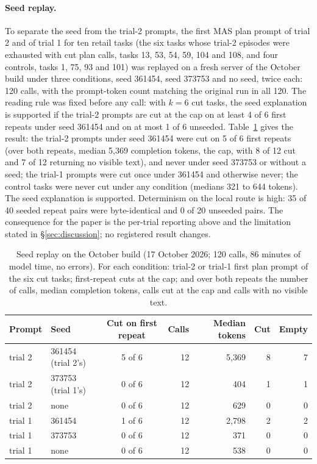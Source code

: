 \paragraph{Seed replay.} To separate the seed from the trial-2 prompts, the first MAS plan prompt of trial 2 and of trial 1 for ten retail tasks (the six tasks whose trial-2 episodes were exhausted with cut plan calls, tasks 13, 53, 54, 59, 104 and 108, and four controls, tasks 1, 75, 93 and 101) was replayed on a fresh server of the October build under three conditions, seed 361454, seed 373753 and no seed, twice each: 120 calls, with the prompt-token count matching the original run in all 120. The reading rule was fixed before any call: with $k = 6$ cut tasks, the seed explanation is supported if the trial-2 prompts are cut at the cap on at least 4 of 6 first repeats under seed 361454 and on at most 1 of 6 unseeded. Table~\ref{tab:replay} gives the result: the trial-2 prompts under seed 361454 were cut on 5 of 6 first repeats (over both repeats, median 5,369 completion tokens, the cap, with 8 of 12 cut and 7 of 12 returning no visible text), and never under seed 373753 or without a seed; the trial-1 prompts were cut once under 361454 and otherwise never; the control tasks were never cut under any condition (medians 321 to 644 tokens). The seed explanation is supported. Determinism on the local route is high: 35 of 40 seeded repeat pairs were byte-identical and 0 of 20 unseeded pairs. The consequence for the paper is the per-trial reporting above and the limitation stated in \S\ref{sec:discussion}; no registered result changes.

\begin{table}[H]
\caption{Seed replay on the October build (17 October 2026; 120 calls, 86 minutes of model time, no errors). For each condition: trial-2 or trial-1 first plan prompt of the six cut tasks; first-repeat cuts at the cap; and over both repeats the number of calls, median completion tokens, calls cut at the cap and calls with no visible text.}
\label{tab:replay}
\begin{center}
\scriptsize
\begin{tabular}{@{}llcrrrr@{}}
\toprule
Prompt & Seed & Cut on first repeat & Calls & Median tokens & Cut & Empty \\
\midrule
trial 2 & 361454 (trial 2's) & 5 of 6 & 12 & 5,369 & 8 & 7 \\
trial 2 & 373753 (trial 1's) & 0 of 6 & 12 & 404 & 1 & 1 \\
trial 2 & none & 0 of 6 & 12 & 629 & 0 & 0 \\
trial 1 & 361454 & 1 of 6 & 12 & 2,798 & 2 & 2 \\
trial 1 & 373753 & 0 of 6 & 12 & 371 & 0 & 0 \\
trial 1 & none & 0 of 6 & 12 & 538 & 0 & 0 \\
\bottomrule
\end{tabular}
\end{center}
\end{table}


